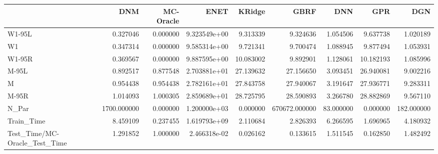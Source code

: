 \begin{tabular}{lrrrrrrrr}
\toprule
{} &          DNM &  MC-Oracle &          ENET &     KRidge &           GBRF &        DNN &        GPR &         DGN \\
\midrule
W1-95L                        &     0.327046 &   0.000000 &  9.323549e+00 &   9.313339 &       9.324636 &   1.054506 &   9.637738 &    1.020189 \\
W1                            &     0.347314 &   0.000000 &  9.585314e+00 &   9.721341 &       9.700474 &   1.088945 &   9.877494 &    1.053931 \\
W1-95R                        &     0.369567 &   0.000000 &  9.887595e+00 &  10.083002 &       9.892901 &   1.128061 &  10.182193 &    1.085996 \\
M-95L                         &     0.892517 &   0.877548 &  2.703881e+01 &  27.139632 &      27.156650 &   3.093451 &  26.940081 &    9.002216 \\
M                             &     0.954438 &   0.954438 &  2.782161e+01 &  27.843758 &      27.940067 &   3.191647 &  27.936771 &    9.283311 \\
M-95R                         &     1.014093 &   1.000305 &  2.859689e+01 &  28.725795 &      28.590893 &   3.266780 &  28.882869 &    9.567110 \\
N\_Par                         &  1700.000000 &   0.000000 &  1.200000e+03 &   0.000000 &  670672.000000 &  83.000000 &   0.000000 &  182.000000 \\
Train\_Time                    &     8.459109 &   0.237455 &  1.619793e+09 &   2.110684 &       2.826393 &   6.266595 &   1.696965 &    4.180932 \\
Test\_Time/MC-Oracle\_Test\_Time &     1.291852 &   1.000000 &  2.466318e-02 &   0.026162 &       0.133615 &   1.511545 &   0.162850 &    1.482492 \\
\bottomrule
\end{tabular}
